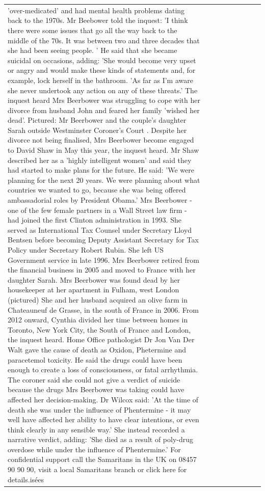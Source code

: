 \begin{table}[H]
\begin{tabular}{lllrlllll}
'over-medicated' and had mental health problems dating back to the 1970s. Mr Beebower told the inquest: 'I think there were some issues that go all the way back to the middle of the 70s. It was between two and three decades that she had been seeing people. ' He said that she became suicidal on occasions, adding: 'She would become very upset or angry and would make these kinds of statements and, for example, lock herself in the bathroom. 'As far as I'm aware she never undertook any action on any of these threats.' The inquest heard Mrs Beerbower was struggling to cope with her divorce from husband John and feared her family 'wished her dead'. Pictured: Mr Beerbower and the couple's daughter Sarah outside Westminster Coroner's Court . Despite her divorce not being finalised, Mrs Beerbower become engaged to David Shaw in May this year, the inquest heard. Mr Shaw described her as a 'highly intelligent women' and said they had started to make plans for the future. He said: 'We were planning for the next 20 years. We were planning about what countries we wanted to go, because she was being offered ambassadorial roles by President Obama.' Mrs Beerbower - one of the few female partners in a Wall Street law firm - had joined the first Clinton administration in 1993. She served as International Tax Counsel under Secretary Lloyd Bentsen before becoming Deputy Assistant Secretary for Tax Policy under Secretary Robert Rubin. She left US Government service in late 1996. Mrs Beerbower retired from the financial business in 2005 and moved to France with her daughter Sarah. Mrs Beerbower was found dead by her housekeeper at her apartment in Fulham, west London (pictured) She and her husband acquired an olive farm in Chateauneuf de Grasse, in the south of France in 2006. From 2012 onward, Cynthia divided her time between homes in Toronto, New York City, the South of France and London, the inquest heard. Home Office pathologist Dr Jon Van Der Walt gave the cause of death as Oxidon, Phetermine and paracetemol toxicity. He said the drugs could have been enough to create a loss of consciousness, or fatal arrhythmia. The coroner said she could not give a verdict of suicide because the drugs Mrs Beerbower was taking could have affected her decision-making. Dr Wilcox said: 'At the time of death she was under the influence of Phentermine - it may well have affected her ability to have clear intentions, or even think clearly in any sensible way.' She instead recorded a narrative verdict, adding: 'She died as a result of poly-drug overdose while under the influence of Phentermine.' For confidential support call the Samaritans in the UK on 08457 90 90 90, visit a local Samaritans branch or click here for details.isées \\

\end{tabular}
\end{table}
